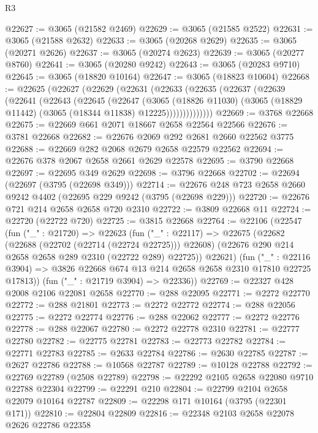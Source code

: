 \begin{lexlean}{R3}
\begin{coremodule}
@22627 := @3065 (@21582 @2469)
@22629 := @3065 (@21585 @2522)
@22631 := @3065 (@21588 @2632)
@22633 := @3065 (@20268 @2629)
@22635 := @3065 (@20271 @2626)
@22637 := @3065 (@20274 @2623)
@22639 := @3065 (@20277 @8760)
@22641 := @3065 (@20280 @9242)
@22643 := @3065 (@20283 @9710)
@22645 := @3065 (@18820 @10164)
@22647 := @3065 (@18823 @10604)
@22668 := @22625
    (@22627
      (@22629
        (@22631
          (@22633
            (@22635
              (@22637
                (@22639
                  (@22641
                    (@22643
                      (@22645
                        (@22647
                          (@3065
                            (@18826 @11030)
                            (@3065 (@18829 @11442) (@3065 (@18344 @11838) @12225))))))))))))))
@22669 := @3768 @22668
@22675 := @22669 @661 @2071 @18667 @2658 @22564 @22566
@22676 := @3781 @22668
@22682 := @22676 @2069 @292 @2681 @2660 @22562 @3775
@22688 := @22669 @282 @2068 @2679 @2658 @22579 @22562
@22694 := @22676 @378 @2067 @2658 @2661 @2629 @22578
@22695 := @3790 @22668
@22697 := @22695 @349 @2629
@22698 := @3796 @22668
@22702 := @22694 (@22697 (@3795 (@22698 @349)))
@22714 := @22676 @248 @723 @2658 @2660 @9242 @4402 (@22695 @229 @9242 (@3795 (@22698 @229)))
@22720 := @22676 @721 @214 @2658 @2658 @720 @2310
@22722 := @3809 @22668 @11
@22724 := @22720 (@22722 @720)
@22725 := @3815 @22668
@22764 := @22106
    (@22547
      (fun ("_" : @21720) =>
      @22623
        (fun ("_" : @22117) =>
        @22675
          (@22682
            (@22688 (@22702 (@22714 (@22724 @22725))) @22608)
            (@22676 @290 @214 @2658 @2658 @289 @2310 (@22722 @289) @22725))
          @22621)
        (fun ("_" : @22116 @3904) =>
        @3826 @22668 @674 @13 @214 @2658 @2658 @2310 @17810 @22725 @17813))
      (fun ("_" : @21719 @3904) => @22336))
@22769 := @22327 @428 @2008 @2106 @22081 @2658
@22770 := @288 @22095
@22771 := @2272 @22770
@22772 := @288 @21801
@22773 := @2272 @22772
@22774 := @288 @22056
@22775 := @2272 @22774
@22776 := @288 @22062
@22777 := @2272 @22776
@22778 := @288 @22067
@22780 := @2272 @22778 @2310
@22781 := @22777 @22780
@22782 := @22775 @22781
@22783 := @22773 @22782
@22784 := @22771 @22783
@22785 := @2633 @22784
@22786 := @2630 @22785
@22787 := @2627 @22786
@22788 := @10568 @22787
@22789 := @10128 @22788
@22792 := @22769 @22789 (@2508 @22789)
@22798 := @22292 @2105 @2658 @22080 @9710 @22788 @22304
@22799 := @22291 @210
@22804 := @22799 @2104 @2658 @22079 @10164 @22787
@22809 := @22298 @171 @10164 (@3795 (@22301 @171))
@22810 := @22804 @22809
@22816 := @22348 @2103 @2658 @22078 @2626 @22786 @22358

\end{coremodule}
\end{lexlean}
